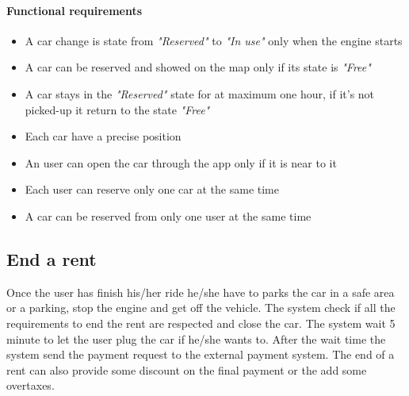 \paragraph{Functional requirements }
\begin{itemize}
	\item A car change is state from \emph{"Reserved"} to \emph{"In use"} only when the engine starts
	\item A car can be reserved and showed on the map only if its state is \emph{"Free"}
	\item A car stays in the \emph{"Reserved"} state for at maximum one hour, if it's not picked-up it return to the state \emph{"Free"}
	\item Each car have a precise position
	\item An user can open the car through the app only if it is near to it
	\item Each user can reserve only one car at the same time
	\item A car can be reserved from only one user at the same time
\end{itemize}

\subsection{End a rent}
Once the user has finish his/her ride he/she have to parks the car in a safe area or a parking, stop the engine and get off the vehicle. The system check if all the requirements to end the rent are respected and close the car. The system wait 5 minute to let the user plug the car if he/she wants to. After the wait time the system send the payment request to the external payment system. The end of a rent can also provide some discount on the final payment or the add some overtaxes.
